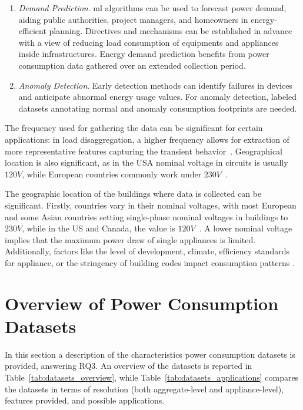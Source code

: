 \begin{enumerate}[label={\textit{A\arabic*.}}, leftmargin=3.5em]
    \item \textit{Demand Prediction}. \acrshort{ml} algorithms can be used to forecast power demand, aiding public authorities, project managers, and homeowners in energy-efficient planning. Directives and mechanisms can be established in advance with a view of reducing load consumption of equipments and appliances inside infrastructures. Energy demand prediction benefits from power consumption data gathered over an extended collection period.

    \item \textit{Anomaly Detection}. Early detection methods can identify failures in devices and anticipate abnormal energy usage values. For anomaly detection, labeled datasets annotating normal and anomaly consumption footprints are needed.
\end{enumerate}

The frequency used for gathering the data can be significant for certain applications: in load disaggregation, a higher frequency allows for extraction of more representative features capturing the transient behavior~\parencite{carriearmelDisaggregationHolyGrail2013}. Geographical location is also significant, as in the USA nominal voltage in circuits is usually $120V$, while European countries commonly work under $230V$~\parencite{internationalelectrotechnicalcommissionWorldPlugs2024}.

The geographic location of the buildings where data is collected can be significant. Firstly, countries vary in their nominal voltages, with most European and some Asian countries setting single-phase nominal voltages in buildings to $230V$, while in the US and Canada, the value is $120V$~\parencite{leeComparisonAnalysisVoltage2017}. A lower nominal voltage implies that the maximum power draw of single appliances is limited. Additionally, factors like the level of development, climate, efficiency standards for appliance, or the stringency of building codes impact consumption patterns \parencite{berardiCrosscountryComparisonBuilding2017}.

\section{Overview of Power Consumption Datasets}

In this section a description of the characteristics power consumption datasets is provided, answering RQ3. An overview of the datasets is reported in Table~\ref{tab:datasets_overview}, while Table~\ref{tab:datasets_applications} compares the datasets in terms of resolution (both aggregate-level and appliance-level), features provided, and possible applications.

